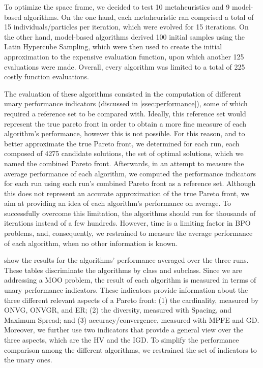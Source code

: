 To optimize the space frame, we decided to test 10 metaheuristics and 9 model-based algorithms. On the one hand, each metaheuristic ran comprised a total of 15 individuals/particles per iteration, which were evolved for 15 iterations. On the other hand, model-based algorithms derived 100 initial samples using the Latin Hypercube Sampling, which were then used to create the initial approximation to the expensive evaluation function, upon which another 125 evaluations were made. Overall, every algorithm was limited to a total of 225 costly function evaluations. 

The evaluation of these algorithms consisted in the computation of different unary performance indicators (discussed in \cref{ssec:performance}), some of which required a reference set to be compared with. Ideally, this reference set would represent the true pareto front in order to obtain a more fine measure of each algorithm's performance, however this is not possible. For this reason, and to better approximate the true Pareto front, we determined for each run, each composed of 4275 candidate solutions, the set of optimal solutions, which we named the combined Pareto front. Afterwards, in an attempt to measure the average performance of each algorithm, we computed the performance indicators for each run using each run's combined Pareto front as a reference set. Although this does not represent an accurate approximation of the true Pareto front, we aim at providing an idea of each algorithm's performance on average. To successfully overcome this limitation, the algorithms should run for thousands of iterations instead of a few hundreds. However, time is a limiting factor in \ac{BPO} problems, and, consequently, we restrained to measure the average performance of each algorithm, when no other information is known.

 show the results for the algorithms' performance averaged over the three runs. These tables discriminate the algorithms by class and subclass. Since we are addressing a \ac{MOO} problem, the result of each algorithm is measured in terms of unary performance indicators. These indicators provide information about the three different relevant aspects of a Pareto front: (1) the cardinality, measured by \ac{ONVG}, \ac{ONVGR}, and \ac{ER}; (2) the diversity, measured with Spacing, and Maximum Spread; and (3) accuracy/convergence, measured with \ac{MPFE} and \ac{GD}. Moreover, we further use two indicators that provide a general view over the three aspects, which are the \ac{HV} and the \ac{IGD}. To simplify the performance comparison among the different algorithms, we restrained the set of indicators to the unary ones. 

